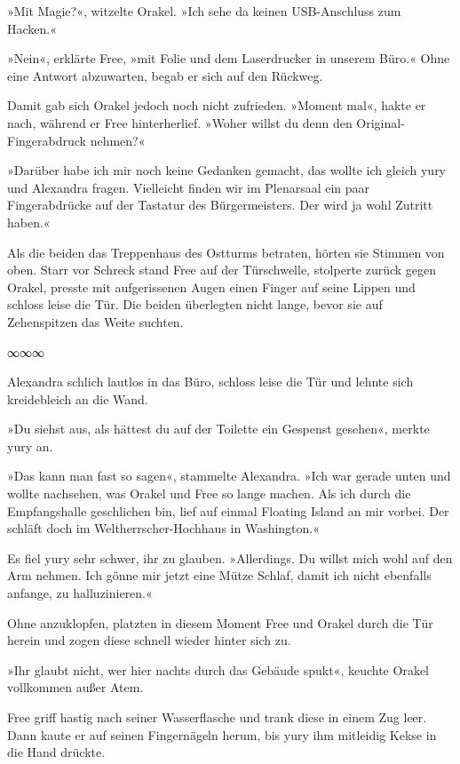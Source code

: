 »Mit Magie?«, witzelte Orakel. »Ich sehe da keinen USB-Anschluss zum Hacken.«

»Nein«, erklärte Free, »mit Folie und dem Laserdrucker in unserem Büro.« Ohne eine Antwort abzuwarten, begab er sich auf den Rückweg.

Damit gab sich Orakel jedoch noch nicht zufrieden. »Moment mal«, hakte er nach, während er Free hinterherlief. »Woher willst du denn den Original-Fingerabdruck nehmen?«

»Darüber habe ich mir noch keine Gedanken gemacht, das wollte ich gleich yury und Alexandra fragen. Vielleicht finden wir im Plenarsaal ein paar Fingerabdrücke auf der Tastatur des Bürgermeisters. Der wird ja wohl Zutritt haben.«

Als die beiden das Treppenhaus des Ostturms betraten, hörten sie Stimmen von oben. Starr vor Schreck stand Free auf der Türschwelle, stolperte zurück gegen Orakel, presste mit aufgerissenen Augen einen Finger auf seine Lippen und schloss leise die Tür. Die beiden überlegten nicht lange, bevor sie auf Zehenspitzen das Weite suchten.

\begin{center}
	∞∞∞
\end{center}

Alexandra schlich lautlos in das Büro, schloss leise die Tür und lehnte sich kreidebleich an die Wand.

»Du siehst aus, als hättest du auf der Toilette ein Gespenst gesehen«, merkte yury an.

»Das kann man fast so sagen«, stammelte Alexandra. »Ich war gerade unten und wollte nachsehen, was Orakel und Free so lange machen. Als ich durch die Empfangshalle geschlichen bin, lief auf einmal Floating Island an mir vorbei. Der schläft doch im Weltherrscher-Hochhaus in Washington.«

Es fiel yury sehr schwer, ihr zu glauben. »Allerdings. Du willst mich wohl auf den Arm nehmen. Ich gönne mir jetzt eine Mütze Schlaf, damit ich nicht ebenfalls anfange, zu halluzinieren.«

Ohne anzuklopfen, platzten in diesem Moment Free und Orakel durch die Tür herein und zogen diese schnell wieder hinter sich zu.

»Ihr glaubt nicht, wer hier nachts durch das Gebäude spukt«, keuchte Orakel vollkommen außer Atem.

Free griff hastig nach seiner Wasserflasche und trank diese in einem Zug leer. Dann kaute er auf seinen Fingernägeln herum, bis yury ihm mitleidig Kekse in die Hand drückte.

